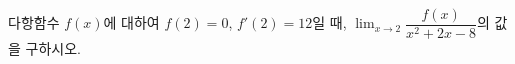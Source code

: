다항함수 $f(x)$에 대하여 $f(2)=0$, $f'(2)=12$일 때, $\displaystyle\lim_{x\to 2}\dfrac{f(x)}{x^2+2x-8}$의 값을 구하시오.
